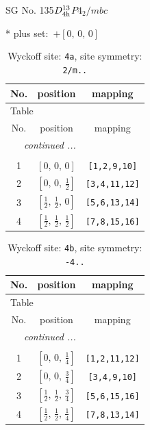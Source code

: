 \documentclass[fleqn,8pt]{jsarticle}
\begin{document}
\setcounter{MaxMatrixCols}{32}

\renewcommand{\tablename}{Table~}
\renewcommand{\figurename}{Figure~}
\begin{center}
\LARGE
SG No. 135\quad$D_{\rm 4h}^{13}$\quad$P4_2/mbc$\quad[ tetragonal ]
\end{center}
* plus set:\,\,\,$+\left[ 0,\, 0,\, 0 \right]$
\renewcommand{\arraystretch}{1.2}
\begin{longtable}{ccc}
\caption{Wyckoff site: {\tt 4a}, site symmetry: {\tt 2/m..}}
 \\
 \hline \hline
No. & position & mapping \\ \hline \endfirsthead

\multicolumn{2}{l}{\tablename\ \thetable{}} \\
 \hline \hline
No. & position & mapping \\ \hline \endhead

 \hline \hline
\multicolumn{2}{r}{\footnotesize\it continued ...} \\ \endfoot

 \hline \hline
\multicolumn{2}{r}{} \\ \endlastfoot

1 & $\left[ 0,\, 0,\, 0 \right]$ & {\tt [1,2,9,10]} \\ \hline
2 & $\left[ 0,\, 0,\, \frac{1}{2} \right]$ & {\tt [3,4,11,12]} \\ \hline
3 & $\left[ \frac{1}{2},\, \frac{1}{2},\, 0 \right]$ & {\tt [5,6,13,14]} \\ \hline
4 & $\left[ \frac{1}{2},\, \frac{1}{2},\, \frac{1}{2} \right]$ & {\tt [7,8,15,16]} \\
\end{longtable}
\renewcommand{\arraystretch}{1.2}
\begin{longtable}{ccc}
\caption{Wyckoff site: {\tt 4b}, site symmetry: {\tt -4..}}
 \\
 \hline \hline
No. & position & mapping \\ \hline \endfirsthead

\multicolumn{2}{l}{\tablename\ \thetable{}} \\
 \hline \hline
No. & position & mapping \\ \hline \endhead

 \hline \hline
\multicolumn{2}{r}{\footnotesize\it continued ...} \\ \endfoot

 \hline \hline
\multicolumn{2}{r}{} \\ \endlastfoot

1 & $\left[ 0,\, 0,\, \frac{1}{4} \right]$ & {\tt [1,2,11,12]} \\ \hline
2 & $\left[ 0,\, 0,\, \frac{3}{4} \right]$ & {\tt [3,4,9,10]} \\ \hline
3 & $\left[ \frac{1}{2},\, \frac{1}{2},\, \frac{3}{4} \right]$ & {\tt [5,6,15,16]} \\ \hline
4 & $\left[ \frac{1}{2},\, \frac{1}{2},\, \frac{1}{4} \right]$ & {\tt [7,8,13,14]} \\
\end{longtable}
\end{document}
